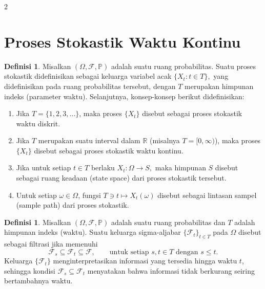 \documentclass[a4paper,extrafontsizes, 9pt]{memoir}
\theoremstyle{definition}
\newtheorem{definisi}[kalstok]{Definisi}
\theoremstyle{plain}
\theoremstyle{remark}
\begin{document}
\begin{multicols}{2}
  \section{\small Proses Stokastik Waktu Kontinu}

  \begin{definisi}
    Misalkan $(\Omega,\mathcal{F},\mathbb{P})$ adalah suatu ruang probabilitas. Suatu proses
    stokastik didefinisikan sebagai keluarga variabel acak
    $\{X_t:t\in T\},$
    yang didefinisikan pada ruang probabilitas tersebut, dengan $T$ merupakan himpunan indeks
    (parameter waktu). Selanjutnya, konsep-konsep berikut didefinisikan:
    \begin{enumerate}[leftmargin=*, itemsep=0.5mm]
      \item Jika $T=\{1,2,3,\ldots\}$, maka proses $\{X_t\}$ disebut sebagai proses stokastik
            waktu diskrit.
      \item Jika $T$ merupakan suatu interval dalam $\mathbb{R}$ (misalnya $T=[0,\infty)$), maka
            proses $\{X_t\}$ disebut sebagai proses stokastik waktu kontinu.
      \item Jika untuk setiap $t\in T$ berlaku
            $X_t:\Omega\to S,$
            maka himpunan $S$ disebut sebagai ruang keadaan (state space) dari proses stokastik
            tersebut.
      \item Untuk setiap $\omega\in\Omega$, fungsi
            $T\ni t\mapsto X_t(\omega)$
            disebut sebagai lintasan sampel (sample path) dari proses stokastik.
    \end{enumerate}
  \end{definisi}

  \begin{definisi}
    Misalkan $(\Omega,\mathcal{F},\mathbb{P})$ adalah suatu ruang probabilitas dan $T$ adalah
    himpunan indeks (waktu). Suatu keluarga sigma-aljabar $\{\mathcal{F}_t\}_{t\in T}$ pada
    $\Omega$ disebut sebagai filtrasi jika memenuhi
    \[\mathcal{F}_s\subseteq\mathcal{F}_t\subseteq\mathcal{F},\qquad
      \text{untuk setiap }s,t\in T\text{ dengan }s\le t.\]
    Keluarga $\{\mathcal{F}_t\}$ menginterpretasikan informasi yang tersedia hingga waktu $t$,
    sehingga kondisi $\mathcal{F}_s\subseteq\mathcal{F}_t$ menyatakan bahwa informasi tidak
    berkurang seiring bertambahnya waktu.
  \end{definisi}


\end{multicols}
\end{document}
